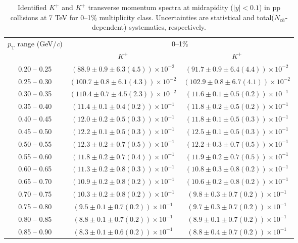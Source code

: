 \begin{table}
\caption{Identified $K^{+}$ and $K^{+}$  transverse momentum spectra at midrapidity ($|y|<0.1$) in pp collisions at 7 TeV for 0--1\% multiplicity class. Uncertainties are statistical and total($N_{ch}$-dependent) systematics, respectively.}
\label{tab:KaonPlus_KaonMinus_0to1}
\begin{center}
\begin{tabular}{ c | c c }
\hline
\multirow{2}{*}{$p_{\mathrm{T}}$ range (GeV/\textit{c})} & \multicolumn{2}{c}{0--1\%} \\ & $K^{+}$& $K^{+}$\\ 
\hline
0.20 -- 0.25 & $(88.9\pm0.9\pm6.3(4.5))\times10^{-2}$ & $(91.7\pm0.9\pm6.4(4.4))\times10^{-2}$ \\ 
0.25 -- 0.30 & $(100.7\pm0.8\pm6.1(4.3))\times10^{-2}$ & $(102.9\pm0.8\pm6.7(4.1))\times10^{-2}$ \\ 
0.30 -- 0.35 & $(110.4\pm0.7\pm4.5(2.3))\times10^{-2}$ & $(11.6\pm0.1\pm0.5(0.2))\times10^{-1}$ \\ 
0.35 -- 0.40 & $(11.4\pm0.1\pm0.4(0.2))\times10^{-1}$ & $(11.8\pm0.2\pm0.5(0.2))\times10^{-1}$ \\ 
0.40 -- 0.45 & $(12.0\pm0.2\pm0.5(0.3))\times10^{-1}$ & $(11.8\pm0.1\pm0.5(0.3))\times10^{-1}$ \\ 
0.45 -- 0.50 & $(12.2\pm0.1\pm0.5(0.3))\times10^{-1}$ & $(12.5\pm0.1\pm0.5(0.3))\times10^{-1}$ \\ 
0.50 -- 0.55 & $(12.3\pm0.2\pm0.7(0.5))\times10^{-1}$ & $(12.2\pm0.3\pm0.7(0.5))\times10^{-1}$ \\ 
0.55 -- 0.60 & $(11.8\pm0.2\pm0.7(0.4))\times10^{-1}$ & $(11.9\pm0.2\pm0.7(0.5))\times10^{-1}$ \\ 
0.60 -- 0.65 & $(11.3\pm0.2\pm0.8(0.3))\times10^{-1}$ & $(10.8\pm0.3\pm0.8(0.2))\times10^{-1}$ \\ 
0.65 -- 0.70 & $(10.9\pm0.2\pm0.8(0.2))\times10^{-1}$ & $(10.6\pm0.2\pm0.8(0.2))\times10^{-1}$ \\ 
0.70 -- 0.75 & $(10.3\pm0.2\pm0.8(0.2))\times10^{-1}$ & $(9.8\pm0.3\pm0.7(0.2))\times10^{-1}$ \\ 
0.75 -- 0.80 & $(9.5\pm0.1\pm0.7(0.2))\times10^{-1}$ & $(9.7\pm0.3\pm0.7(0.2))\times10^{-1}$ \\ 
0.80 -- 0.85 & $(8.8\pm0.1\pm0.7(0.2))\times10^{-1}$ & $(8.9\pm0.1\pm0.7(0.2))\times10^{-1}$ \\ 
0.85 -- 0.90 & $(8.3\pm0.1\pm0.6(0.2))\times10^{-1}$ & $(8.8\pm0.4\pm0.7(0.2))\times10^{-1}$ \\ 

\end{tabular}
\end{center}
\end{table}
